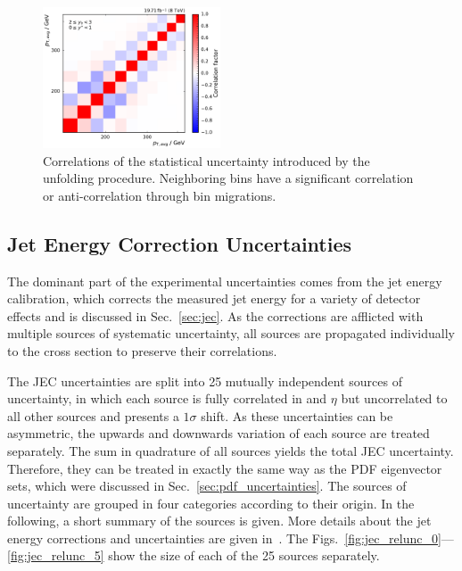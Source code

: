 \begin{figure}[htbp]
    \includegraphics[width=0.47\textwidth]{figures/measurement/unf_nlo_corr_yb2ys0.pdf}
    \caption[Correlations of statistical uncertainty]{Correlations of the
        statistical uncertainty introduced by the unfolding procedure.
        Neighboring bins have a significant correlation or anti-correlation
        through bin migrations.}
    \label{fig:corr_unfolding_nlo}
\end{figure}

\subsection{Jet Energy Correction Uncertainties}

The dominant part of the experimental uncertainties comes from the jet energy
calibration, which corrects the measured jet energy for a variety of detector
effects and is discussed in Sec.~\ref{sec:jec}. As the corrections are afflicted
with multiple sources of systematic uncertainty, all sources are propagated
individually to the cross section to preserve their correlations.

The JEC uncertainties are split into 25 mutually independent sources of
uncertainty, in which each source is fully correlated in \pt and $\eta$
but uncorrelated to all other sources and presents a $1\sigma$
shift. As these uncertainties can be asymmetric, the upwards and downwards
variation of each source are treated separately. The sum in quadrature of all
sources yields the total JEC uncertainty. Therefore, they can be treated
in exactly the same way as the PDF eigenvector sets, which were discussed in
Sec.~\ref{sec:pdf_uncertainties}. The sources of uncertainty are grouped in four
categories according to their origin. In the following, a short summary of the
sources is given. More details about the jet energy corrections and
uncertainties are given in~\cite{jec_paper}. The
Figs.~\ref{fig:jec_relunc_0}---\ref{fig:jec_relunc_5} show the size of each of
the 25 sources separately.

